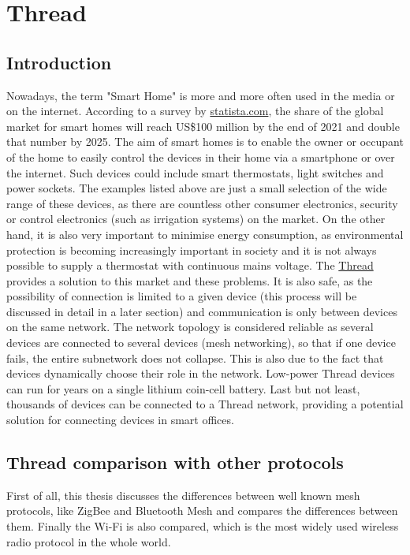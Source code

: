 \section{Thread}


\subsection{Introduction}
Nowadays, the term "Smart Home" is more and more often used in the media or on the internet. According to a survey by \href{https://www.statista.com/outlook/dmo/smart-home/worldwide#smart-homes}{statista.com}\cite{Statista}, the share of the global market for smart homes will reach US\$100 million by the end of 2021 and double that number by 2025. The aim of smart homes is to enable the owner or occupant of the home to easily control the devices in their home via a smartphone or over the internet. Such devices could include smart thermostats, light switches and power sockets. The examples listed above are just a small selection of the wide range of these devices, as there are countless other consumer electronics, security or control electronics (such as irrigation systems) on the market. On the other hand, it is also very important to minimise energy consumption, as environmental protection is becoming increasingly important in society and it is not always possible to supply a thermostat with continuous mains voltage. The \href{https://www.threadgroup.org/}{Thread}\cite{threadgroupurl} provides a solution to this market and these problems.
It is also safe, as the possibility of connection is limited to a given device (this process will be discussed in detail in a later section) and communication is only between devices on the same network. The network topology is considered reliable as several devices are connected to several devices (mesh networking), so that if one device fails, the entire subnetwork does not collapse. This is also due to the fact that devices dynamically choose their role in the network. Low-power Thread devices can run for years on a single lithium coin-cell battery. Last but not least, thousands of devices can be connected to a Thread network, providing a potential solution for connecting devices in smart offices.

\subsection{Thread comparison with other protocols}
First of all, this thesis discusses the differences between well known mesh protocols, like ZigBee and Bluetooth Mesh and compares the differences between them. Finally the Wi-Fi is also compared, which is the most widely used wireless radio protocol in the whole world.\cite{threadcompare}\cite{threadcomapare2}

